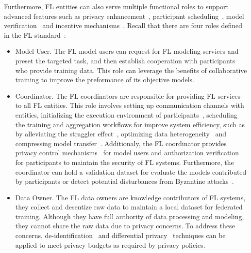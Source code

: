 Furthermore, FL entities can also serve multiple functional roles to support advanced features such as privacy enhancement~\cite{geyer2017differentially, bonawitz2017practical, niu2020billion}, participant scheduling~\cite{li2022federated, abdulrahman2020fedmccs}, model verification~\cite{tekgul2021waffle, shao2022fedtracker} and incentive mechanisms~\cite{yu2020fairness}.
Recall that there are four roles defined in the FL standard~\cite{IEEEstd3652}:

\begin{itemize}
    \item Model User. The FL model users can request for FL modeling services and preset the targeted task, and then establish cooperation with participants who provide training data. This role can leverage the benefits of collaborative training to improve the preformance of its objective models.
    
    \item Coordinator. The FL coordinators are responsible for providing FL services to all FL entities. This role involves setting up communication channels with entities, initializing the execution environment of participants~\cite{hanzlik2021mlcapsule}, scheduling the training and aggregation workflows for improve system efficiency, such as by alleviating the straggler effect~\cite{li2021fedsae, chai2020tifl}, optimizing data heterogeneity~\cite{duan2019astraea, abdulrahman2020fedmccs} and compressing model transfer~\cite{konevcny2016federated, sattler2019robust}.
    Additionaly, the FL coordinator provides privacy control mechanisms~\cite{bonawitz2017practical, el2022differential, hesamifard2018privacy} for model users and authorization verification for participants to maintain the security of FL systems. 
    Furthermore, the coordinator can hold a validation dataset for evaluate the models contributed by participants or detect potential disturbances from Byzantine attacks~\cite{sattler2020byzantine}.

    \item Data Owner. The FL data owners are knowledge contributors of FL systems, they collect and desentize raw data to maintain a local dataset for federated training. Although they have full authority of data processing and modeling, they cannot share the raw data due to privacy concerns. To address these concerns, de-identification~\cite{act1996health} and differential privacy~\cite{dwork2006differential} techniques can be applied to meet privacy budgets as required by privacy policies.
    

\end{itemize}
